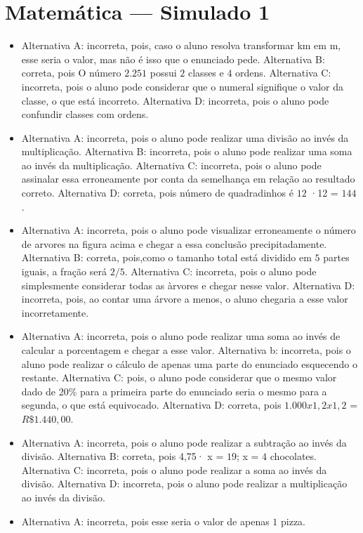 \section*{Matemática — Simulado 1}

\begin{itemize}
\item Alternativa A: incorreta, pois, caso o aluno resolva transformar km em
m, esse seria o valor, mas não é isso que o enunciado pede.
Alternativa B: correta, pois O número $2.251$ possui $2$ classes e $4$ ordens.
Alternativa C: incorreta, pois o aluno pode considerar que o numeral
signifique o valor da classe, o que está incorreto.
Alternativa D: incorreta, pois o aluno pode confundir classes com
ordens.
\item Alternativa A: incorreta, pois o aluno pode realizar uma divisão ao
invés da multiplicação.
Alternativa B: incorreta, pois o aluno pode realizar uma soma ao invés
da multiplicação.
Alternativa C: incorreta, pois o aluno pode assinalar essa erroneamente
por conta da semelhança em relação ao resultado correto.
Alternativa D: correta, pois número de quadradinhos é $12$ ·12 = $144$.
\item Alternativa A: incorreta, pois o aluno pode visualizar erroneamente o
número de arvores na figura acima e chegar a essa conclusão
precipitadamente.
Alternativa B: correta, pois,como o tamanho total está dividido em $5$
partes iguais, a fração será $2/5$.
Alternativa C: incorreta, pois o aluno pode simplesmente considerar
todas as àrvores e chegar nesse valor.
Alternativa D: incorreta, pois, ao contar uma árvore a menos, o aluno
chegaria a esse valor incorretamente.
\item Alternativa A: incorreta, pois o aluno pode realizar uma soma ao invés
de calcular a porcentagem e chegar a esse valor.
Alternativa b: incorreta, pois o aluno pode realizar o cálculo de apenas
uma parte do enunciado esquecendo o restante.
Alternativa C: pois, o aluno pode considerar que o mesmo valor dado de
20\% para a primeira parte do enunciado seria o mesmo para a segunda, o
que está equivocado.
Alternativa D: correta, pois $1.000 x 1,2 x 1,2$ = $R\$1.440,00$.
\item Alternativa A: incorreta, pois o aluno pode realizar a subtração ao
invés da divisão.
Alternativa B: correta, pois 4,75· x = $19$; x = $4$ chocolates.
Alternativa C: incorreta, pois o aluno pode realizar a soma ao invés da
divisão.
Alternativa D: incorreta, pois o aluno pode realizar a multiplicação ao
invés da divisão.
\item Alternativa A: incorreta, pois esse seria o valor de apenas $1$ pizza.

\end{itemize}
